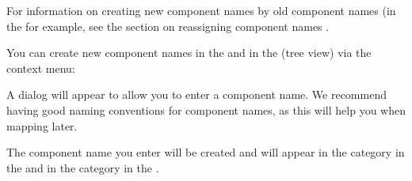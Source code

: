 
For information on creating new component names by  old component names (in the \gdcompnamesview{} for example, see the section on reassigning component names . 

You can create new component names in the \gdcompnamebrowser{}  and in the \gdomeditor{} (tree view) via the context menu:\\


A dialog will appear to allow you to enter a component name. We recommend having good naming conventions for component names, as this will help you when mapping later. 

The component name you enter will be created and will appear in the  category in the \gdomeditor{} and in the  category in the \gdcompnamebrowser{}. 

